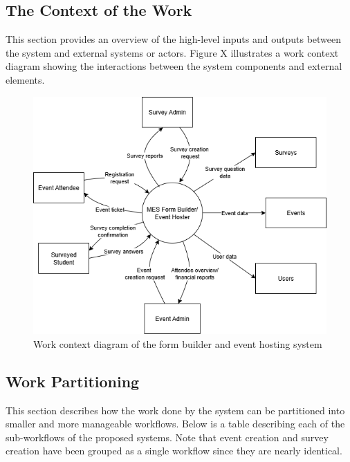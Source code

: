 \documentclass[12pt]{article}
\begin{document}
\subsection{The Context of the Work}

This section provides an overview of the high-level inputs and outputs between the system and external systems or actors. Figure X illustrates a work context diagram showing the interactions between the system components and external elements.

\begin{center}
\begin{figure}[H]
    \centering
    \includegraphics[width=1\linewidth]{images/work_context.png}
    \caption{Work context diagram of the form builder and event hosting system}\label{workcontext}
\end{figure}
\end{center}

\subsection{Work Partitioning}

This section describes how the work done by the system can be partitioned into smaller and more manageable workflows. Below is a table describing each of the sub-workflows of the proposed systems. Note that event creation and survey creation have been grouped as a single workflow since they are nearly identical.
\end{document}
